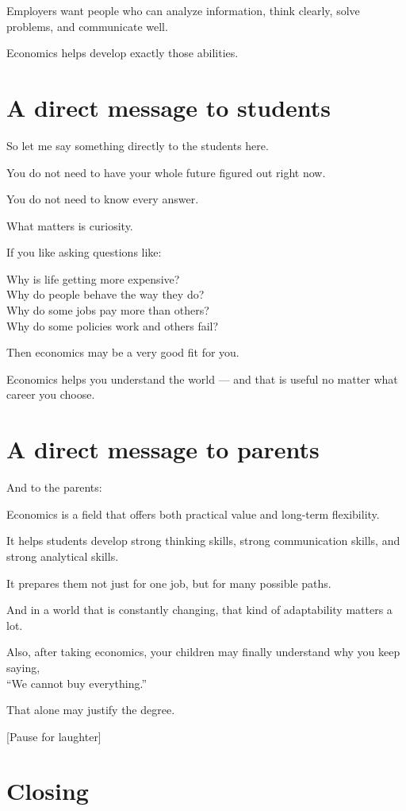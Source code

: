 \documentclass[12pt]{article}
\begin{document}
Employers want people who can analyze information, think clearly, solve problems, and communicate well.

Economics helps develop exactly those abilities.

\section*{A direct message to students}

So let me say something directly to the students here.

You do not need to have your whole future figured out right now.

You do not need to know every answer.

What matters is curiosity.

If you like asking questions like:

Why is life getting more expensive?\\
Why do people behave the way they do?\\
Why do some jobs pay more than others?\\
Why do some policies work and others fail?

Then economics may be a very good fit for you.

Economics helps you understand the world --- and that is useful no matter what career you choose.

\section*{A direct message to parents}

And to the parents:

Economics is a field that offers both practical value and long-term flexibility.

It helps students develop strong thinking skills, strong communication skills, and strong analytical skills.

It prepares them not just for one job, but for many possible paths.

And in a world that is constantly changing, that kind of adaptability matters a lot.

Also, after taking economics, your children may finally understand why you keep saying,\\
“We cannot buy everything.”

That alone may justify the degree.

[Pause for laughter]

\section*{Closing}
\end{document}
